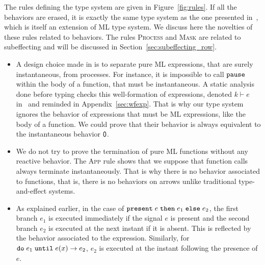 \documentclass[9pt]{sigplanconf}
\begin{document}
The rules defining the type system are given in Figure~\ref{fig:rules}. If all the behaviors are erased, it is exactly the same type system as the one presented in~\cite{Mandel:2005}, which is itself an extension of ML type system. We discuss here the novelties of these rules related to behaviors. The rules \textsc{Process} and \textsc{Mask} are related to subeffecting and will be discussed in Section~\ref{sec:subeffecting_row}. 

\begin{itemize}

\item A design choice made in \rml{} is to separate pure ML expressions, that are surely instantaneous, from processes. For instance, it is impossible to call $\mathtt{pause}$ within the body of a function, that must be instantaneous. A static analysis done before typing checks this well-formation of expressions, denoted $k \vdash e$ in~\cite{Mandel:2005} and reminded in Appendix~\ref{sec:wfexp}. That is why our type system ignores the behavior of expressions that must be ML expressions, like the body of a function. We could prove that their behavior is always equivalent to the instantaneous behavior $\textsf{0}$.


\item We do not try to prove the termination of pure ML functions without any reactive behavior. The \textsc{App} rule shows that we suppose that function calls always terminate instantaneously. That is why there is no behavior associated to functions, that is, there is no behaviors on arrows unlike traditional type-and-effect systems.

\item As explained earlier, in the case of $\mathtt{present}\; e \;\mathtt{then}\; e_1 \;\mathtt{else}\; e_2$, the first branch $e_1$ is executed immediately if the signal $e$ is present and the second branch $e_2$ is executed at the next instant if it is absent. This is reflected by the behavior associated to the expression. Similarly, for $\mathtt{do}\; e_1 \;\mathtt{until}\; e(x) \rightarrow e_2$, $e_2$ is executed at the instant following the presence of $e$.


\end{itemize}
\end{document}
